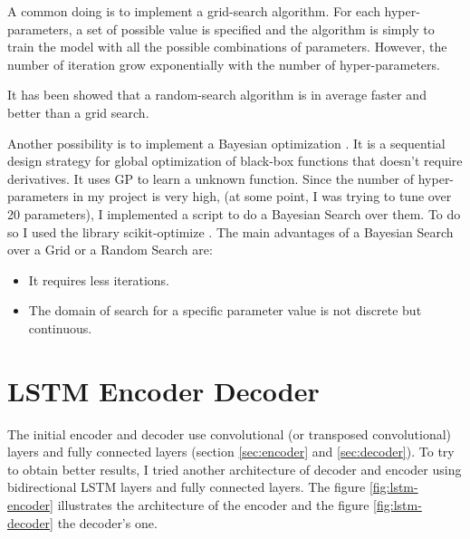 \documentclass[12pt]{report}
\begin{document}
A common doing is to implement a grid-search algorithm.
For each hyper-parameters, a set of possible value is specified and the algorithm is simply to train the model with all the possible combinations of parameters.
However, the number of iteration grow exponentially with the number of hyper-parameters.

It has been showed that a random-search algorithm is in average faster and better than a grid search.

Another possibility is to implement a Bayesian optimization \cite{frazier_tutorial_2018, adams_tutorial_nodate}.
It is a sequential design strategy for global optimization of black-box functions that doesn't require derivatives.
It uses GP to learn a unknown function.
Since the number of hyper-parameters in my project is very high, (at some point, I was trying to tune over 20 parameters), I implemented a script to do a Bayesian Search over them.
To do so I used the library scikit-optimize \cite{noauthor_scikit-optimize_nodate}.
The main advantages of a Bayesian Search over a Grid or a Random Search are:
\begin{itemize}
    \item It requires less iterations.
    \item The domain of search for a specific parameter value is not discrete but continuous.
\end{itemize}

\section{LSTM Encoder Decoder}

The initial encoder and decoder use convolutional (or transposed convolutional) layers and fully connected layers (section \ref{sec:encoder} and \ref{sec:decoder}).
To try to obtain better results, I tried another architecture of decoder and encoder using bidirectional LSTM layers and fully connected layers.
The figure \ref{fig:lstm-encoder} illustrates the architecture of the encoder and the figure \ref{fig:lstm-decoder} the decoder's one.
\end{document}
